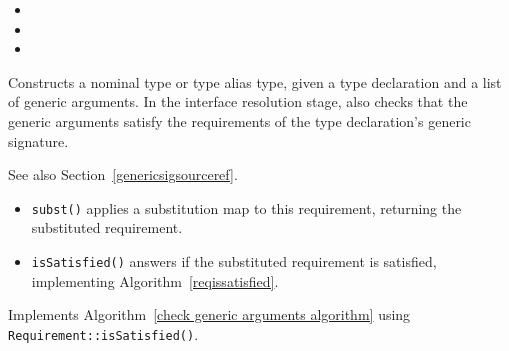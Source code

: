 \documentclass[../generics]{subfiles}
\begin{document}
\begin{itemize}
\item {}
\item {}
\item {}
\end{itemize}
Constructs a nominal type or type alias type, given a type declaration and a list of generic arguments. In the interface resolution stage, also checks that the generic arguments satisfy the requirements of the type declaration's generic signature.

See also Section~\ref{genericsigsourceref}.
\begin{itemize}
\item \texttt{subst()} applies a substitution map to this requirement, returning the substituted requirement.
\item \texttt{isSatisfied()} answers if the substituted requirement is satisfied, implementing Algorithm~\ref{reqissatisfied}.
\end{itemize}

Implements Algorithm~\ref{check generic arguments algorithm} using \texttt{Requirement::isSatisfied()}.
\end{document}
